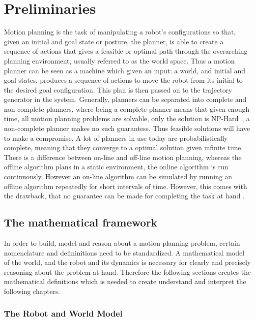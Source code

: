 \chapter{Preliminaries}

Motion planning is the task of manipulating a robot's configurations so that,
given an initial and goal state or posture, the planner, is able to create a
sequence of actions that gives a feasible or optimal path through the
overarching planning environment, usually referred to as the world space. Thus a
motion planner can be seen as a machine which given an input: a world, and
initial and goal states, produces a sequence of actions to move the robot from
its initial to the desired goal configuration. This plan is then passed on to
the trajectory generator in the system. Generally, planners can be separated
into complete and non-complete planners, where being a complete planner means
that given enough time, all motion planning problems are solvable, only the
solution is NP-Hard~\cite{Lav06}, a non-complete planner makes no such
guarantess. Thus feasible solutions will have to make a compromise. A lot of
planners in use today are probabilistically complete, meaning that they converge
to a optimal solution given infinite time. There is a difference between on-line
and off-line motion planning, whereas the offline algorithm plans in a static
environment, the online algorithm is run continuously. However an on-line
algorithm can be simulated by running an offline algorithm repeatedly for short
intervals of time. However, this comes with the drawback, that no guarantee can
be made for completing the task at hand \cite{Lav06}.

\section{The mathematical framework}

In order to build, model and reason about a motion planning problem, certain
nomenclature and defininitions need to be standardized. A mathematical model of
the world, and the robot and its dynamics is necessary for clearly and precisely
reasoning about the problem at hand. Therefore the following sections creates
the mathematical definitions which is needed to create understand and interpret
the following chapters.

\subsection{The Robot and World Model}

